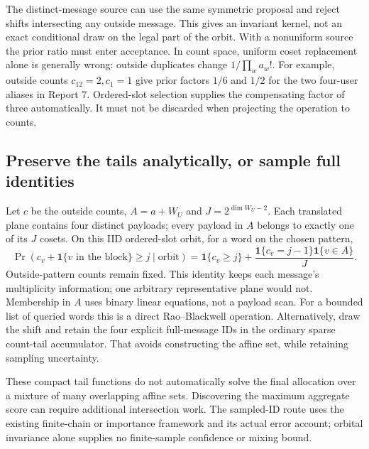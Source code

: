 \documentclass[10pt,a4paper]{article}
\begin{document}
The distinct-message source can use the same symmetric proposal and reject shifts intersecting any
outside message. This gives an invariant kernel, not an exact conditional draw on the legal part of
the orbit. With a nonuniform source the prior ratio must enter acceptance. In count space, uniform
coset replacement alone is generally wrong: outside duplicates change $1/\prod_w a_w!$.
For example, outside counts $c_{12}=2,c_1=1$ give prior factors $1/6$ and $1/2$ for the two
four-user aliases in Report 7. Ordered-slot selection supplies the compensating factor of three
automatically. It must not be discarded when projecting the operation to counts.

\subsection{Preserve the tails analytically, or sample full identities}
Let $c$ be the outside counts, $A=a+W_U$ and $J=2^{\dim W_U-2}$.
Each translated plane contains four distinct payloads; every payload in $A$ belongs to exactly one
of its $J$ cosets. On this IID ordered-slot orbit, for a word on the chosen pattern,
\begin{equation}
 \Pr(c_v+\mathbf1\{v\text{ in the block}\}\geq j\mid\text{orbit})
 =\mathbf1\{c_v\geq j\}
  +\frac{\mathbf1\{c_v=j-1\}\mathbf1\{v\in A\}}{J}.
 \label{eq:affine-orbit-tail}
\end{equation}
Outside-pattern counts remain fixed. This identity keeps each message's multiplicity information;
one arbitrary representative plane would not. Membership in $A$ uses binary linear equations,
not a payload scan. For a bounded list of queried words this is a direct Rao--Blackwell operation.
Alternatively, draw the shift and retain the four explicit full-message IDs in the ordinary sparse
count-tail accumulator. That avoids constructing the affine set, while retaining sampling uncertainty.

These compact tail functions do not automatically solve the final allocation over a mixture of many
overlapping affine sets. Discovering the maximum aggregate score can require additional intersection
work. The sampled-ID route uses the existing finite-chain or importance framework and its actual
error account; orbital invariance alone supplies no finite-sample confidence or mixing bound.
\end{document}
